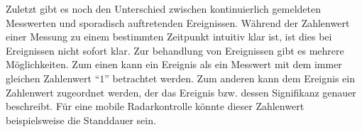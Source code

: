 Zuletzt gibt es noch den Unterschied zwischen kontinuierlich gemeldeten Messwerten und sporadisch auftretenden Ereignissen.
Während der Zahlenwert einer Messung zu einem bestimmten Zeitpunkt intuitiv klar ist, ist dies bei Ereignissen nicht sofort klar.
Zur behandlung von Ereignissen gibt es mehrere Möglichkeiten.
Zum einen kann ein Ereignis als ein Messwert mit dem immer gleichen Zahlenwert "`$1$"' betrachtet werden.
Zum anderen kann dem Ereignis ein Zahlenwert zugeordnet werden, der das Ereignis bzw. dessen Signifikanz genauer beschreibt.
Für eine mobile Radarkontrolle könnte dieser Zahlenwert beispielsweise die Standdauer sein.
